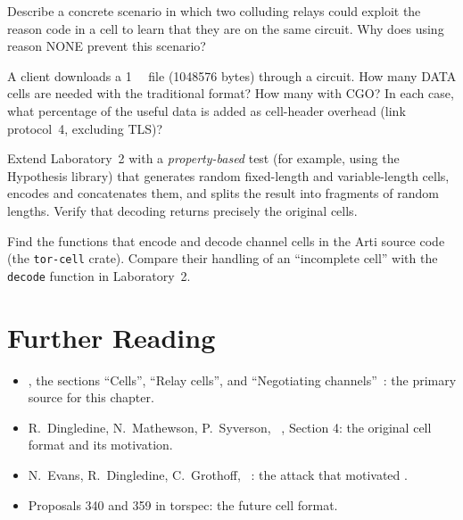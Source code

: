 \begin{esercizio}[2]\label{es:08-destroy}
Describe a concrete scenario in which two colluding relays could exploit the reason code in a  cell to learn that they are on the same circuit. Why does using reason NONE prevent this scenario?
\end{esercizio}

\begin{esercizio}[2]\label{es:08-efficienza}
A client downloads a \SI{1}{\mebi\byte} file (\num{1048576} bytes) through a circuit. How many DATA cells are needed with the traditional format? How many with CGO? In each case, what percentage of the useful data is added as cell-header overhead (link protocol~4, excluding TLS)?
\end{esercizio}

\begin{esercizio}[3]\label{es:08-lab-fuzz}
Extend Laboratory~2 with a \emph{property-based} test (for example, using the Hypothesis library) that generates random fixed-length and variable-length cells, encodes and concatenates them, and splits the result into fragments of random lengths. Verify that decoding returns precisely the original cells.
\end{esercizio}

\begin{esercizio}[3]\label{es:08-arti}
Find the functions that encode and decode channel cells in the Arti source code (the \texttt{tor-cell} crate). Compare their handling of an \enquote{incomplete cell} with the \texttt{decode} function in Laboratory~2.
\end{esercizio}

\section*{Further Reading}
\begin{itemize}
  \item {}, the sections \enquote{Cells}, \enquote{Relay cells}, and \enquote{Negotiating channels}~\cite{torspec}: the primary source for this chapter.
  \item R.~Dingledine, N.~Mathewson, P.~Syverson, ~\cite{dingledine2004tor}, Section 4: the original cell format and its motivation.
  \item N.~Evans, R.~Dingledine, C.~Grothoff, ~\cite{evans2009congestion}: the attack that motivated .
  \item Proposals 340 and 359 in torspec: the future cell format.
\end{itemize}
